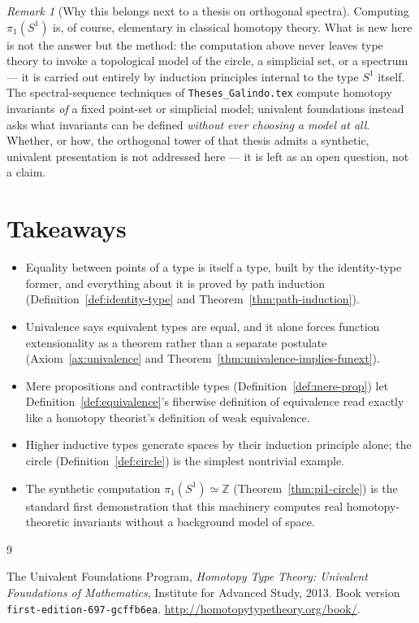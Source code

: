 \documentclass[11pt]{amsart}
\theoremstyle{plain}
\theoremstyle{definition}
\theoremstyle{remark}
\newtheorem{remark}[theorem]{Remark}
\newcommand{\ZZ}{\mathbb{Z}}
\newcommand{\Scirc}{S^1}
\begin{document}
\begin{remark}[Why this belongs next to a thesis on orthogonal spectra]\label{rmk:bridge-to-thesis}
  Computing $\pi_1(\Scirc)$ is, of course, elementary in classical
  homotopy theory. What is new here is not the answer but the method:
  the computation above never leaves type theory to invoke a
  topological model of the circle, a simplicial set, or a spectrum ---
  it is carried out entirely by induction principles internal to the
  type $\Scirc$ itself. The spectral-sequence techniques of
  \texttt{Theses\_Galindo.tex} compute homotopy invariants \emph{of} a
  fixed point-set or simplicial model; univalent foundations instead
  asks what invariants can be defined \emph{without ever choosing a
  model at all}. Whether, or how, the orthogonal tower of that thesis
  admits a synthetic, univalent presentation is not addressed here ---
  it is left as an open question, not a claim.
\end{remark}

\section{Takeaways}\label{sec:takeaways}

\begin{itemize}[leftmargin=1.6em]
  \item Equality between points of a type is itself a type, built by
    the identity-type former, and everything about it is proved by
    path induction (Definition~\ref{def:identity-type} and Theorem~\ref{thm:path-induction}).
  \item Univalence says equivalent types are equal, and it alone forces
    function extensionality as a theorem rather than a separate
    postulate (Axiom~\ref{ax:univalence} and Theorem~\ref{thm:univalence-implies-funext}).
  \item Mere propositions and contractible types
    (Definition~\ref{def:mere-prop}) let Definition~\ref{def:equivalence}'s
    fiberwise definition of equivalence read exactly like a homotopy
    theorist's definition of weak equivalence.
  \item Higher inductive types generate spaces by their induction
    principle alone; the circle (Definition~\ref{def:circle}) is the simplest
    nontrivial example.
  \item The synthetic computation $\pi_1(\Scirc)\simeq\ZZ$
    (Theorem~\ref{thm:pi1-circle}) is the standard first demonstration that
    this machinery computes real homotopy-theoretic invariants without
    a background model of space.
\end{itemize}

\begin{thebibliography}{9}

The Univalent Foundations Program,
\emph{Homotopy Type Theory: Univalent Foundations of Mathematics},
Institute for Advanced Study, 2013.
Book version \texttt{first-edition-697-gcffb6ea}.
\url{http://homotopytypetheory.org/book/}.

\end{thebibliography}
\end{document}

